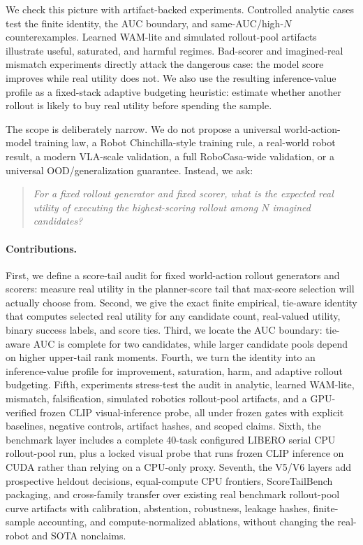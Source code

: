 \documentclass{article}
\begin{document}
We check this picture with artifact-backed experiments. Controlled analytic cases test the finite identity, the AUC boundary, and same-AUC/high-$N$ counterexamples. Learned WAM-lite and simulated rollout-pool artifacts illustrate useful, saturated, and harmful regimes. Bad-scorer and imagined-real mismatch experiments directly attack the dangerous case: the model score improves while real utility does not. We also use the resulting inference-value profile as a fixed-stack adaptive budgeting heuristic: estimate whether another rollout is likely to buy real utility before spending the sample.

The scope is deliberately narrow. We do not propose a universal world-action-model training law, a Robot Chinchilla-style training rule, a real-world robot result, a modern VLA-scale validation, a full RoboCasa-wide validation, or a universal OOD/generalization guarantee. Instead, we ask:
\begin{quote}
\emph{For a fixed rollout generator and fixed scorer, what is the expected real utility of executing the highest-scoring rollout among $N$ imagined candidates?}
\end{quote}

\paragraph{Contributions.}
First, we define a score-tail audit for fixed world-action rollout generators and scorers: measure real utility in the planner-score tail that max-score selection will actually choose from. Second, we give the exact finite empirical, tie-aware identity that computes selected real utility for any candidate count, real-valued utility, binary success labels, and score ties. Third, we locate the AUC boundary: tie-aware AUC is complete for two candidates, while larger candidate pools depend on higher upper-tail rank moments. Fourth, we turn the identity into an inference-value profile for improvement, saturation, harm, and adaptive rollout budgeting. Fifth, experiments stress-test the audit in analytic, learned WAM-lite, mismatch, falsification, simulated robotics rollout-pool artifacts, and a GPU-verified frozen CLIP visual-inference probe, all under frozen gates with explicit baselines, negative controls, artifact hashes, and scoped claims. Sixth, the benchmark layer includes a complete 40-task configured LIBERO serial CPU rollout-pool run, plus a locked visual probe that runs frozen CLIP inference on CUDA rather than relying on a CPU-only proxy. Seventh, the V5/V6 layers add prospective heldout decisions, equal-compute CPU frontiers, ScoreTailBench packaging, and cross-family transfer over existing real benchmark rollout-pool curve artifacts with calibration, abstention, robustness, leakage hashes, finite-sample accounting, and compute-normalized ablations, without changing the real-robot and SOTA nonclaims.
\end{document}
